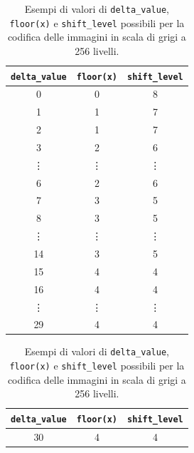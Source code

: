 \documentclass{article}
\begin{document}
\begin{itemize}
            \vspace{0,3cm}
            \begin{table}[h]
                \centering
                \small
                \def\arraystretch{1.3} %
                \caption{Esempi di valori di \texttt{delta\_value}, \texttt{floor(x)} e \texttt{shift\_level} possibili per la codifica delle immagini in scala di grigi a 256 livelli.}
                \begin{tabular}{||c|c|c||}
                    \hline
                    \texttt{delta\_value} & \texttt{floor(x)\footnotemark} & \texttt{shift\_level}\\
                    \hline \hline
                    0       & 0         & 8         \\\hline
                    1       & 1         & 7         \\\hline
                    2       & 1         & 7         \\\hline
                    3       & 2         & 6         \\\hline
                    \vdots  & \vdots    & \vdots    \\\hline
                    6       & 2         & 6         \\\hline
                    7       & 3         & 5         \\\hline
                    8       & 3         & 5         \\\hline
                    \vdots  & \vdots    & \vdots    \\\hline
                    14      & 3         & 5         \\\hline
                    15      & 4         & 4         \\\hline
                    16      & 4         & 4         \\\hline
                    \vdots  & \vdots    & \vdots    \\\hline
                    29      & 4         & 4         \\\hline
                \end{tabular}\hspace{20pt}
                \begin{tabular}{||c|c|c||}
                    \hline
                    \texttt{delta\_value} & \texttt{floor(x)\footnotemark[\value{footnote}]} & \texttt{shift\_level}\\
                    \hline \hline
                    30      & 4         & 4         \\\hline

\end{tabular}
\end{table}
\end{itemize}
\end{document}
